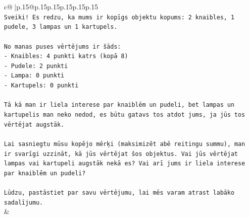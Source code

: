 \documentclass{article}
\begin{document}
{\begin{supertabular}{c@{$\;$}|p{.15\linewidth}@{}p{.15\linewidth}p{.15\linewidth}p{.15\linewidth}p{.15\linewidth}p{.15\linewidth}}
{{{\\ 
\texttt{Sveiki! Es redzu, ka mums ir kopīgs objektu kopums: 2 knaibles, 1 pudele, 3 lampas un 1 kartupels.} \\
\\ 
\texttt{No manas puses vērtējums ir šāds:} \\
\texttt{{-} Knaibles: 4 punkti katrs (kopā 8)} \\
\texttt{{-} Pudele: 2 punkti} \\
\texttt{{-} Lampa: 0 punkti} \\
\texttt{{-} Kartupels: 0 punkti} \\
\\ 
\texttt{Tā kā man ir liela interese par knaiblēm un pudeli, bet lampas un kartupelis man neko nedod, es būtu gatavs tos atdot jums, ja jūs tos vērtējat augstāk.} \\
\\ 
\texttt{Lai sasniegtu mūsu kopējo mērķi (maksimizēt abē reitingu summu), man ir svarīgi uzzināt, kā jūs vērtējat šos objektus. Vai jūs vērtējat lampas vai kartupeli augstāk nekā es? Vai arī jums ir liela interese par knaiblēm un pudeli?} \\
\\ 
\texttt{Lūdzu, pastāstiet par savu vērtējumu, lai mēs varam atrast labāko sadalījumu.} \\
            }
        }
    }
    & \\ \\


\end{supertabular}}
\end{document}
